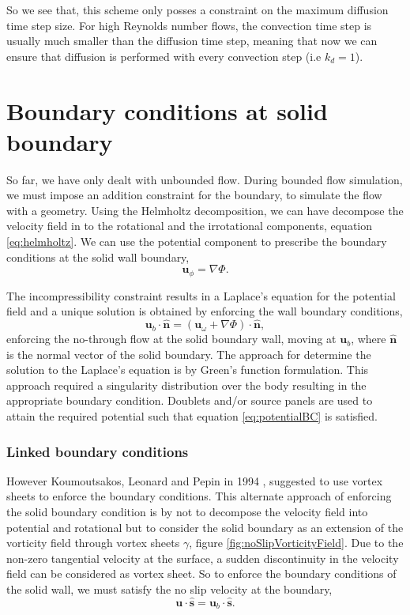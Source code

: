 So we see that, this scheme only posses a constraint on the maximum diffusion time step size. For high Reynolds number flows, the convection time step is usually much smaller than the diffusion time step, meaning that now we can ensure that diffusion is performed with every convection step (i.e $k_d = 1$).

\section{Boundary conditions at solid boundary}
\label{sec:boundaryConditions}

So far, we have only dealt with unbounded flow. During bounded flow simulation, we must impose an addition constraint for the boundary, to simulate the flow with a geometry. Using the Helmholtz decomposition, we can have decompose the velocity field in to the rotational and the irrotational components, equation \ref{eq:helmholtz}. We can use the potential component to prescribe the boundary conditions at the solid wall boundary,
	\begin{equation}
	\mathbf{u}_{\phi} = \nabla\Phi.
	\end{equation}

The incompressibility constraint results in a Laplace's equation for the potential field and a unique solution is obtained by enforcing the wall boundary conditions,
	\begin{equation}
	\mathbf{u}_b\cdot\mathbf{\hat{n}} = \left(\mathbf{u}_{\omega} + \nabla\Phi\right) \cdot \mathbf{\hat{n}},
	\label{eq:potentialBC}
	\end{equation}
enforcing the no-through flow at the solid boundary wall, moving at $\mathbf{u}_b$, where $\mathbf{\hat{n}}$ is the normal vector of the solid boundary. The approach for determine the solution to the Laplace's equation is by Green's function formulation. This approach required a singularity distribution over the body resulting in the appropriate boundary condition. Doublets and/or source panels are used to attain the required potential such that equation \ref{eq:potentialBC} is satisfied.

\subsubsection{Linked boundary conditions}

However Koumoutsakos, Leonard and Pepin in 1994 \cite{Koumoutsakos1994b}, suggested to use vortex sheets to enforce the boundary conditions. This alternate approach of enforcing the solid boundary condition is by not to decompose the velocity field into potential and rotational but to consider the solid boundary as an extension of the vorticity field through vortex sheets $\gamma$, figure \ref{fig:noSlipVorticityField}. Due to the non-zero tangential velocity at the surface, a sudden discontinuity in the velocity field can be considered as vortex sheet. So to enforce the boundary conditions of the solid wall, we must satisfy the no slip velocity at the boundary,
	\begin{equation}
	\mathbf{u}\cdot\mathbf{\hat{s}} = \mathbf{u}_b\cdot\mathbf{\hat{s}}.
	\end{equation}

